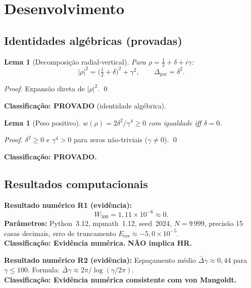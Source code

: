 \documentclass[12pt,a4paper]{article}
\newtheorem{lemma}[theorem]{Lema}
\theoremstyle{definition}
\begin{document}
\section{Desenvolvimento}\label{sec:desenvolvimento}

\subsection{Identidades algébricas (provadas)}

\begin{boxproved}
\begin{lemma}[Decomposição radial-vertical]\label{lem:decomp}
Para $\rho = \tfrac{1}{2} + \delta + i\gamma$:
\[
  |\rho|^2 = \bigl(\tfrac{1}{2}+\delta\bigr)^2 + \gamma^2, \qquad
  \Delta_{\mathrm{par}} = \delta^2.
\]
\end{lemma}
\begin{proof}
Expansão direta de $|\rho|^2$. \qed
\end{proof}
\textbf{Classificação: PROVADO} (identidade algébrica).
\end{boxproved}

\begin{boxproved}
\begin{lemma}[Peso positivo]\label{lem:peso}
$w(\rho) = 2\delta^2/\gamma^4 \ge 0$ com igualdade iff $\delta = 0$.
\end{lemma}
\begin{proof}
$\delta^2 \ge 0$ e $\gamma^4 > 0$ para zeros não-triviais ($\gamma \ne 0$). \qed
\end{proof}
\textbf{Classificação: PROVADO.}
\end{boxproved}

\subsection{Resultados computacionais}

\begin{boxnumerical}
\textbf{Resultado numérico R1 (evidência):}
\[
  W_{500} = 1{,}11 \times 10^{-6} \approx 0.
\]
\textbf{Parâmetros:} Python~3.12, mpmath~1.12, seed~2024, $N=9\,999$,
precisão 15 casas decimais, erro de truncamento $E_{\mathrm{res}} \approx
-5{,}0 \times 10^{-5}$.\\
\textbf{Classificação: Evidência numérica.}
\textbf{NÃO implica HR.}
\end{boxnumerical}

\begin{boxnumerical}
\textbf{Resultado numérico R2 (evidência):}
Espaçamento médio $\bar\Delta\gamma \approx 0{,}44$ para $\gamma \le 100$.
Formula: $\bar\Delta\gamma \approx 2\pi/\log(\gamma/2\pi)$.\\
\textbf{Classificação: Evidência numérica consistente com von Mangoldt.}
\end{boxnumerical}
\end{document}
